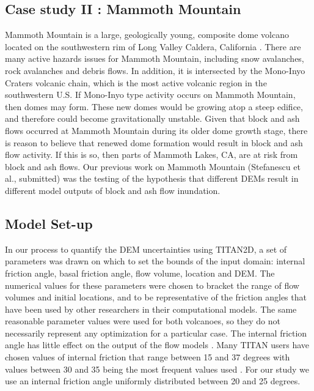 \documentclass[12pt]{article}
\begin{document}
\subsection{Case study II : Mammoth Mountain}

Mammoth Mountain is a large, geologically young, composite dome
volcano located on the southwestern rim of Long Valley Caldera,
California \citep{Bailey1989}.  There are many active hazards issues
for Mammoth Mountain, including snow avalanches, rock avalanches and
debris flows. In addition, it is intersected by the Mono-Inyo Craters
volcanic chain, which is the most active volcanic region in the
southwestern U.S.  If Mono-Inyo type activity occurs on Mammoth
Mountain, then domes may form.  These new domes would be growing atop
a steep edifice, and therefore could become gravitationally unstable.
Given that block and ash flows occurred at Mammoth Mountain during its
older dome growth stage, there is reason to believe that renewed dome
formation would result in block and ash flow activity. If this is so,
then parts of Mammoth Lakes, CA, are at risk from block and ash flows.
Our previous work on Mammoth Mountain (Stefanescu et al., submitted)
was the testing of the hypothesis that different DEMs result in
different model outputs of block and ash flow inundation.

\subsection{Model Set-up}
\label{subsec: Model Set-up}
In our process to quantify the DEM uncertainties using TITAN2D, a set
of parameters was drawn on which to set the bounds of the input
domain: internal friction angle, basal friction angle, flow volume,
location and DEM. The numerical values for these parameters were
chosen to bracket the range of flow volumes and initial locations, and
to be representative of the friction angles that have been used by
other researchers in their computational models.  The same reasonable
parameter values were used for both volcanoes, so they do not
necessarily represent any optimization for a particular case.  The
internal friction angle has little effect on the output of the flow
models \citep{Keith, sheridan_2005}. Many TITAN users have chosen
values of internal friction that range between 15 and 37 degrees with
values between 30 and 35 being the most frequent values used
\citep{Patra2005, murcia_2010}.  For our study we use an internal
friction angle uniformly distributed between 20 and 25 degrees.
\end{document}
